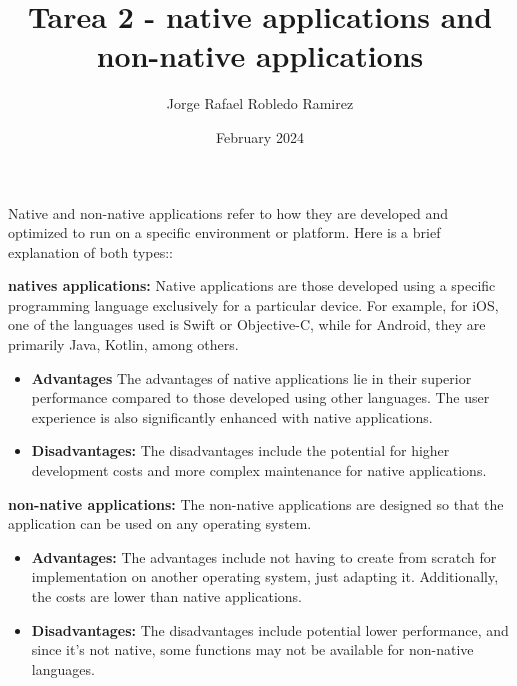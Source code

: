 \documentclass{article}
\title{Tarea 2 - native applications and non-native applications}
\author{Jorge Rafael Robledo Ramirez}
\date{February 2024}
\begin{document}
\maketitle Native and non-native applications refer to how they are developed and optimized to run on a specific environment or platform. Here is a brief explanation of both types::

\textbf{natives applications:} Native applications are those developed using a specific programming language exclusively for a particular device. For example, for iOS, one of the languages used is Swift or Objective-C, while for Android, they are primarily Java, Kotlin, among others.
  \begin{itemize}
    \item \textbf{Advantages} The advantages of native applications lie in their superior performance compared to those developed using other languages. The user experience is also significantly enhanced with native applications.

    \item \textbf{Disadvantages:} The disadvantages include the potential for higher development costs and more complex maintenance for native applications.

  \end{itemize}

\textbf{non-native applications:} The non-native applications are designed so that the application can be used on any operating system.

  \begin{itemize}
    \item \textbf{Advantages:} The advantages include not having to create from scratch for implementation on another operating system, just adapting it. Additionally, the costs are lower than native applications.

    \item \textbf{Disadvantages:} The disadvantages include potential lower performance, and since it's not native, some functions may not be available for non-native languages.

  \end{itemize}
\end{document}

